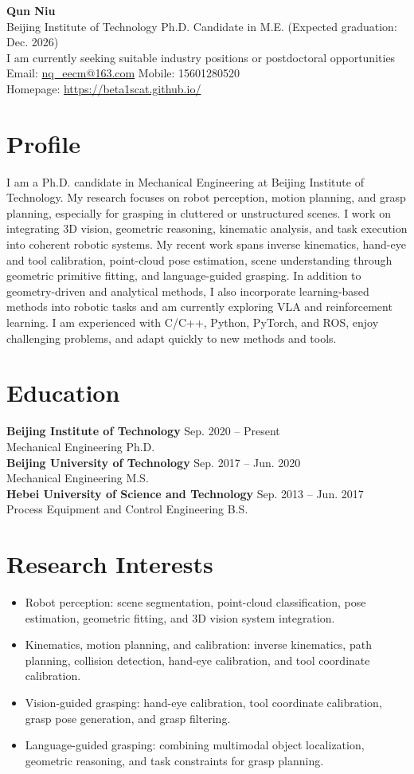 \documentclass[11pt,a4paper]{article}
\newcommand{\entry}[4]{%
  \textbf{#1} \hfill #2\\
  {\color{textgray}#3} \hfill {#4}\\[-2pt]
}
\begin{document}
{\LARGE\bfseries\color{titlecolor} Qun Niu}\\[4pt]
Beijing Institute of Technology \quad Ph.D. Candidate in M.E. (Expected graduation: Dec. 2026)\\
I am currently seeking suitable industry positions or postdoctoral opportunities\\
Email: \href{mailto:nq_eecm@163.com}{nq\_eecm@163.com} \quad Mobile: 15601280520\\
Homepage: \href{https://beta1scat.github.io/}{https://beta1scat.github.io/}

\section*{Profile}
I am a Ph.D. candidate in Mechanical Engineering at Beijing Institute of Technology. My research focuses on robot perception, motion planning, and grasp planning, especially for grasping in cluttered or unstructured scenes. I work on integrating 3D vision, geometric reasoning, kinematic analysis, and task execution into coherent robotic systems. My recent work spans inverse kinematics, hand-eye and tool calibration, point-cloud pose estimation, scene understanding through geometric primitive fitting, and language-guided grasping. In addition to geometry-driven and analytical methods, I also incorporate learning-based methods into robotic tasks and am currently exploring VLA and reinforcement learning. I am experienced with C/C++, Python, PyTorch, and ROS, enjoy challenging problems, and adapt quickly to new methods and tools.

\section*{Education}
\entry{Beijing Institute of Technology}{Sep. 2020 -- Present}{Mechanical Engineering}{Ph.D.}
\entry{Beijing University of Technology}{Sep. 2017 -- Jun. 2020}{Mechanical Engineering}{M.S.}
\entry{Hebei University of Science and Technology}{Sep. 2013 -- Jun. 2017}{Process Equipment and Control Engineering}{B.S.}

\section*{Research Interests}
\begin{itemize}
	\item Robot perception: scene segmentation, point-cloud classification, pose estimation, geometric fitting, and 3D vision system integration.
	\item Kinematics, motion planning, and calibration: inverse kinematics, path planning, collision detection, hand-eye calibration, and tool coordinate calibration.
	\item Vision-guided grasping: hand-eye calibration, tool coordinate calibration, grasp pose generation, and grasp filtering.
	\item Language-guided grasping: combining multimodal object localization, geometric reasoning, and task constraints for grasp planning.
\end{itemize}
\end{document}
